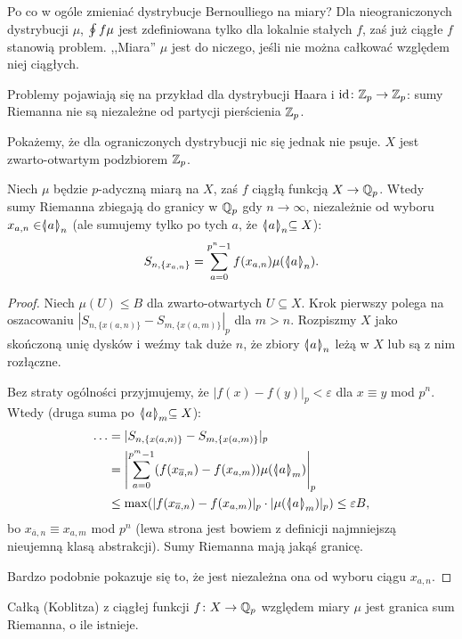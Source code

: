 Po co w ogóle zmieniać dystrybucje Bernoulliego na miary?
Dla nieograniczonych dystrybucji $\mu$, $\oint f\mu$ jest zdefiniowana tylko dla lokalnie stałych $f$, zaś już ciągłe $f$ stanowią problem.
,,Miara'' $\mu$ jest do niczego, jeśli nie można całkować względem niej ciągłych.

Problemy pojawiają się na przykład dla dystrybucji Haara i $\textrm{id} \colon \mathbb Z_p \to \mathbb Z_p$: sumy Riemanna nie są niezależne od partycji pierścienia $\mathbb Z_p$.

Pokażemy, że dla ograniczonych dystrybucji nic się jednak nie psuje. 
$X$ jest zwarto-otwartym podzbiorem $\mathbb Z_p$.

\begin{fakt}
	Niech $\mu$ będzie $p$-adyczną miarą na $X$, zaś $f$ ciągłą funkcją $ X \to \mathbb Q_p$.
	Wtedy sumy Riemanna zbiegają do granicy w $\mathbb Q_p$ gdy $n \to \infty$, niezależnie od wyboru $x_{a,n} \in \mathrel{\langle\mkern-3.85mu\mid\mkern-4mu} {a}\mathrel{\mkern-4mu\mid\mkern-3.85mu\rangle}_{n}$ (ale sumujemy tylko po tych $a$, że $\mathrel{\langle\mkern-3.85mu\mid\mkern-4mu} {a}\mathrel{\mkern-4mu\mid\mkern-3.85mu\rangle}_{n} \subseteq X$):
	\[
		S_{n, \{x_{a, n}\}} = \sum_{a=0}^{p^n-1} f(x_{a, n}) \mu(\mathrel{\langle\mkern-3.85mu\mid\mkern-4mu} {a}\mathrel{\mkern-4mu\mid\mkern-3.85mu\rangle}_{n}).
	\]
\end{fakt}

\begin{proof}
	Niech $\mu(U) \le B$ dla zwarto-otwartych $U \subseteq X$.
	Krok pierwszy polega na oszacowaniu $|S_{n, \{x(a, n)\}} - S_{m, \{x(a, m)\}}|_p$ dla $m > n$.
	Rozpiszmy $X$ jako skończoną unię dysków i weźmy tak duże $n$, że zbiory $\mathrel{\langle\mkern-3.85mu\mid\mkern-4mu} {a}\mathrel{\mkern-4mu\mid\mkern-3.85mu\rangle}_{n}$ leżą w $X$ lub są z nim rozłączne.

	Bez straty ogólności przyjmujemy, że $|f(x) - f(y)|_p < \varepsilon$ dla $x \equiv y$ mod $p^n$.
	Wtedy (druga suma po $\mathrel{\langle\mkern-3.85mu\mid\mkern-4mu} {a}\mathrel{\mkern-4mu\mid\mkern-3.85mu\rangle}_{m} \subseteq X$):
	\begin{align*}
		\ldots & = |S_{n, \{x(a, n)\}} - S_{m, \{x(a, m)\}}|_p \\
		& = \left|\sum_{a = 0}^{p^m-1} (f(x_{\overline a, n}) - f(x_{a, m})) \mu(\mathrel{\langle\mkern-3.85mu\mid\mkern-4mu} {a}\mathrel{\mkern-4mu\mid\mkern-3.85mu\rangle}_{m})\right|_p \\
		& \le \max (|f(x_{\overline a, n}) - f(x_{a, m})|_p \cdot |\mu(\mathrel{\langle\mkern-3.85mu\mid\mkern-4mu} {a}\mathrel{\mkern-4mu\mid\mkern-3.85mu\rangle}_{m})|_p) \le \varepsilon B,
	\end{align*}
	bo $x_{\overline a, n} \equiv x_{a, m}$ mod $p^n$ (lewa strona jest bowiem z definicji najmniejszą nieujemną klasą abstrakcji).
	Sumy Riemanna mają jakąś granicę.

	Bardzo podobnie pokazuje się to, że jest niezależna ona od wyboru ciągu $x_{a,n}$.
\end{proof}

\begin{definicja}
	Całką (Koblitza) z ciągłej funkcji $f \colon X \to \mathbb Q_p$ względem miary $\mu$ jest granica sum Riemanna, o ile istnieje.
\end{definicja}

